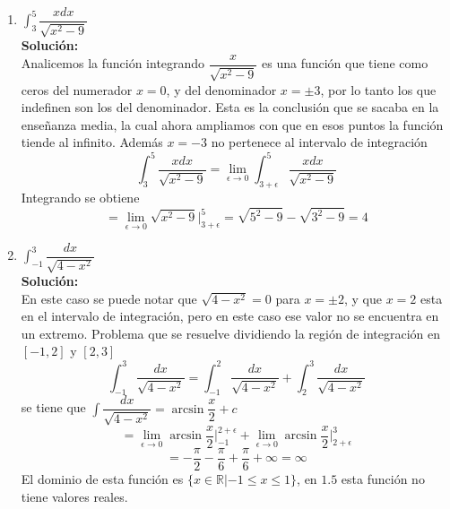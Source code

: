 \documentclass[10pt,twoside]{SelfArx} %
\begin{document}
\begin{enumerate}
\item $ \displaystyle\int_{3}^{5}\dfrac{xdx}{\sqrt{x^{2}-9}} $\\
\textbf{Solución:}\\
Analicemos la función integrando
$  \dfrac{x}{\sqrt{x^{2}-9}}  $ es una función que tiene como ceros del numerador $ x=0 $, y del denominador $ x=\pm3 $, por lo tanto los que indefinen son los del denominador. Esta es la conclusión que se sacaba en la enseñanza media, la cual ahora ampliamos con que en esos puntos la función tiende al infinito. Además $ x=-3 $ no pertenece al intervalo de integraci\'on
\begin{equation}
\int_{3}^{5}\dfrac{xdx}{\sqrt{x^{2}-9}}=\lim\limits_{\epsilon\rightarrow0}\int_{3+\epsilon}^{5}\dfrac{xdx}{\sqrt{x^{2}-9}}
\end{equation}
Integrando se obtiene
\begin{equation}
=\lim\limits_{\epsilon\rightarrow0}\sqrt{x^{2}-9}\bigg|_{3+\epsilon}^{5}=\sqrt{5^{2}-9}-\sqrt{3^{2}-9}=4
\end{equation}

\item $ \displaystyle\int_{-1}^{3}\dfrac{dx}{\sqrt{4-x^{2}}} $\\
\textbf{Solución:}\\
En este caso se puede notar que $ \sqrt{4-x^{2}}=0 $ para $ x=\pm2 $, y que $ x=2 $ esta en el intervalo de integraci\'on, pero en este caso ese valor no se encuentra en un extremo. Problema que se resuelve dividiendo la región de integración en $ [-1,2] $ y $ [2,3] $
\begin{equation}
\int_{-1}^{3}\dfrac{dx}{\sqrt{4-x^{2}}}=\int_{-1}^{2}\dfrac{dx}{\sqrt{4-x^{2}}}+\int_{2}^{3}\dfrac{dx}{\sqrt{4-x^{2}}}
\end{equation}
se tiene que $ \displaystyle\int\dfrac{dx}{\sqrt{4-x^{2}}}=\arcsin\dfrac{x}{2}+c $
\begin{equation}
=\lim\limits_{\epsilon\rightarrow0}\arcsin\dfrac{x}{2}\bigg|_{-1}^{2+\epsilon}+\lim\limits_{\epsilon\rightarrow0}\arcsin\dfrac{x}{2}\bigg|_{2+\epsilon}^{3}
\end{equation}
\begin{equation}
=-\dfrac{\pi}{2}-\dfrac{\pi}{6}+\dfrac{\pi}{6}+\infty=\infty
\end{equation}
El dominio de esta funci\'on es $ \{x\in \mathbb{R}|-1\leq x\leq 1\} $, en $ 1.5 $ esta función no tiene valores reales.
\end{enumerate}
\end{document}
